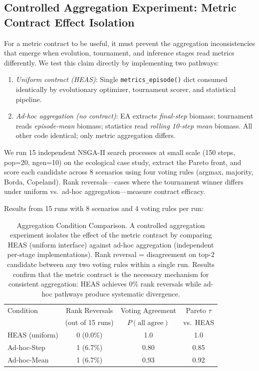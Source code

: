 \documentclass{wscpaperproc}
\begin{document}
\subsection{Controlled Aggregation Experiment: Metric Contract Effect Isolation}
\label{sec:controlled-agg}

For a metric contract to be useful, it must prevent the aggregation inconsistencies
that emerge when evolution, tournament, and inference stages read metrics differently.
We test this claim directly by implementing two pathways:

\begin{enumerate}
\item \emph{Uniform contract (HEAS)}: Single \texttt{metrics\_episode()} dict consumed
identically by evolutionary optimizer, tournament scorer, and statistical pipeline.
\item \emph{Ad-hoc aggregation (no contract)}: EA extracts \emph{final-step} biomass;
tournament reads \emph{episode-mean} biomass; statistics read \emph{rolling 10-step mean}
biomass. All other code identical; only metric aggregation differs.
\end{enumerate}

We run 15 independent NSGA-II search processes at small scale (150 steps, pop=20,
ngen=10) on the ecological case study, extract the Pareto front, and score each
candidate across 8 scenarios using four voting rules (argmax, majority, Borda,
Copeland). Rank reversals---cases where the tournament winner differs under uniform
vs.\ ad-hoc aggregation---measure contract efficacy.

Results from 15 runs with 8 scenarios and 4 voting rules per run:

\begin{table}[ht]
\centering\small
\caption{Aggregation Condition Comparison. A controlled aggregation experiment isolates
the effect of the metric contract by comparing HEAS (uniform interface) against ad-hoc
aggregation (independent per-stage implementations). Rank reversal = disagreement on
top-2 candidate between any two voting rules within a single run. Results confirm that the metric contract is the necessary mechanism for consistent aggregation: HEAS achieves 0\% rank reversals while ad-hoc pathways produce systematic divergence.}
\label{tab:agg-control}
\begin{tabular}{lccc}
\toprule
Condition & Rank Reversals & Voting Agreement & Pareto $\tau$ \\
& (out of 15 runs) & $P(\text{all agree})$ & vs.\ HEAS \\
\midrule
HEAS (uniform) & 0 (0.0\%) & 1.0 & 1.0 \\
Ad-hoc-Step & 1 (6.7\%) & 0.80 & 0.85 \\
Ad-hoc-Mean & 1 (6.7\%) & 0.93 & 0.92 \\
\bottomrule
\end{tabular}
\end{table}
\end{document}
